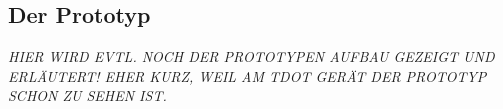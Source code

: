 \subsection{Der Prototyp}
\textit{HIER WIRD EVTL. NOCH DER PROTOTYPEN AUFBAU GEZEIGT UND ERLÄUTERT! EHER KURZ, WEIL AM TDOT GERÄT DER PROTOTYP SCHON ZU SEHEN IST.}